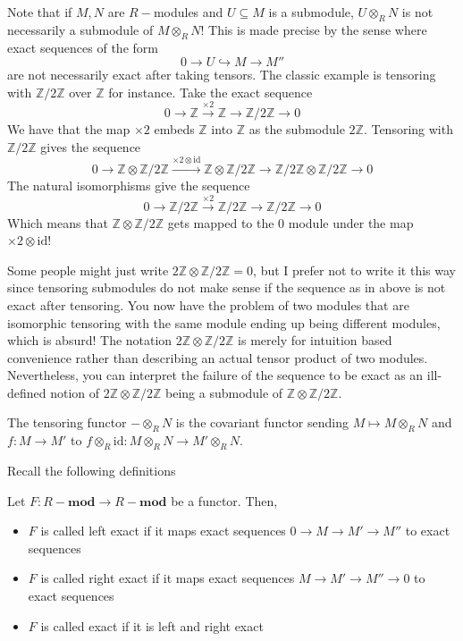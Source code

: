 \documentclass[12pt,reqno]{amsart}
\numberwithin{theorem}{section}
\theoremstyle{definition}
\theoremstyle{remark}
\numberwithin{equation}{section}
\newcommand{\Z}{\mathbb Z}
\theoremstyle{definition}
\newcommand{\id}{\mathrm{id}}
\begin{document}
\begin{example}\label{tensorexample}
    Note that if $M, N$ are $R-$modules and $U\subseteq M$ is a submodule, $U\otimes_RN$ is not necessarily a submodule of $M\otimes_R N$! This is made precise by the sense where exact sequences of the form
    $$0 \rightarrow U \hookrightarrow M \rightarrow M''$$
    are not necessarily exact after taking tensors. The classic example is tensoring with $\Z/2\Z$ over $\Z$ for instance. Take the exact sequence
    $$0 \rightarrow \Z \xrightarrow{\times 2} \Z \rightarrow \Z/2\Z \rightarrow 0$$
    We have that the map $\times 2$ embeds $\Z$ into $\Z$ as the submodule $2\Z$. Tensoring with $\Z/2\Z$ gives the sequence
    $$0 \rightarrow \Z \otimes \Z/2\Z\xrightarrow{\times 2\otimes \id} \Z \otimes \Z/2\Z \rightarrow \Z/2\Z \otimes \Z/2\Z \rightarrow 0$$
    The natural isomorphisms give the sequence
     $$0 \rightarrow  \Z/2\Z\xrightarrow{\times 2} \Z/2\Z \rightarrow \Z/2\Z \rightarrow 0$$
     Which means that $\Z \otimes \Z/2\Z$ gets mapped to the 0 module under the map $\times 2 \otimes \id$! 
\end{example}
\begin{remark}
    Some people might just write $2\Z \otimes \Z/2\Z = 0$, but I prefer not to write it this way since tensoring submodules do not make sense if the sequence as in above is not exact after tensoring. You now have the problem of two modules that are isomorphic tensoring with the same module ending up being different modules, which is absurd! The notation $2\Z \otimes \Z/2\Z$ is merely for intuition based convenience rather than describing an actual tensor product of two modules. Nevertheless, you can interpret the failure of the sequence to be exact as an ill-defined notion of $2\Z \otimes \Z/2\Z$ being a submodule of $\Z\otimes \Z/2\Z$.
\end{remark}
\begin{definition}
     The tensoring functor $-\otimes_RN$ is the covariant functor sending $M \mapsto M\otimes_RN$ and $f:M\rightarrow M'$ to $f \otimes_R \id: M\otimes_R N \rightarrow M'\otimes_RN$.
\end{definition}
Recall the following definitions
\begin{definition}
    Let $F:R-\mathbf {mod}\rightarrow R-\mathbf {mod}$ be a functor. Then, 
    \begin{itemize}
        \item $F$ is called left exact if it maps exact sequences $0 \rightarrow M\rightarrow M'\rightarrow M''$ to exact sequences
        \item $F$ is called right exact if it maps exact sequences $M\rightarrow M'\rightarrow M'' \rightarrow 0$ to exact sequences
        \item $F$ is called exact if it is left and right exact
    \end{itemize}
\end{definition}
\end{document}
